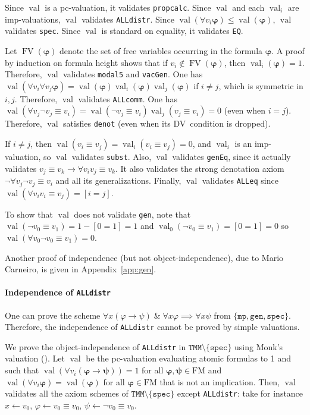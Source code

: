\documentclass[11pt]{article}
\newcommand*{\andd}{\;\&\;}
\newcommand*{\rimplies}{\implies}
\renewcommand*{\phi}{\varphi}
\newcommand*{\FM}{\mathrm{FM}}
\DeclareMathOperator{\FV}{FV}
\DeclareMathOperator{\val}{val}
\theoremstyle{plain}
\theoremstyle{definition}
\theoremstyle{remark}
\begin{document}
Since $\val$ is a pc-valuation, it validates \texttt{propcalc}.
Since $\val$ and each $\val_i$ are imp-valuations, $\val$ validates \texttt{ALLdistr}.
Since $\val(\forall v_i \bm\phi) \leq \val(\bm\phi)$, $\val$ validates \texttt{spec}.
Since $\val$ is standard on equality, it validates \texttt{EQ}.

Let $\FV(\bm\phi)$ denote the set of free variables occurring in the formula $\bm\phi$.
A proof by induction on formula height shows that if $v_i \notin \FV(\bm\phi)$, then
$\val_i(\bm\phi) = 1$.
Therefore, $\val$ validates \texttt{modal5} and \texttt{vacGen}.
One has $\val(\forall v_i \forall v_j \bm\phi) = \val(\bm\phi) \val_i(\bm\phi) \val_j(\bm\phi)$
if $i \neq j$, which is symmetric in $i, j$.
Therefore, $\val$ validates \texttt{ALLcomm}.
One has
$\val(\forall v_j \neg v_j \equiv v_i) = \val(\neg v_j \equiv v_i) \val_j(v_j \equiv v_i) = 0$
(even when $i=j$).
Therefore, $\val$ satisfies \texttt{denot} (even when its DV~condition is dropped).

If $i \neq j$, then $\val(v_i \equiv v_j) = \val_i(v_i \equiv v_j) = 0$, and $\val_i$ is an
imp-valuation, so $\val$ validates \texttt{subst}.
Also, $\val$ validates \texttt{genEq}, since it actually validates
$v_j \equiv v_k \to \forall v_i v_j \equiv v_k$.
It also validates the strong denotation axiom $\neg \forall v_j \neg v_j \equiv v_i$
and all its generalizations.
Finally, $\val$ validates \texttt{ALLeq} since $\val(\forall v_i v_i \equiv v_j) = [i = j]$.

To show that $\val$ does not validate \texttt{gen}, note that
$\val(\neg v_0 \equiv v_1) = 1 - [0 = 1] = 1$ and $\val_0(\neg v_0 \equiv v_1) = [0 = 1] = 0$
so $\val(\forall v_0 \neg v_0 \equiv v_1) = 0$.

Another proof of independence (but not object-independence), due to Mario Carneiro, is given in
Appendix~\ref{app:gen}.


\paragraph{Independence of \texttt{ALLdistr}}

One can prove the scheme $\forall x (\phi \to \psi) \andd \forall x \phi \rimplies \forall x \psi$
from $\{ \texttt{mp}, \texttt{gen}, \texttt{spec} \}$.
Therefore, the independence of \texttt{ALLdistr} cannot be proved by simple valuations.


We prove the object-independence of \texttt{ALLdistr} in $\texttt{TMM} \setminus \{ \texttt{spec} \}$
using Monk's valuation (\cite[Thm.~9, Part~4 (C4)]{monk}).
Let $\val$ be the pc-valuation evaluating atomic formulas to 1 and such that
$\val(\forall v_i (\bm\phi \to \bm\psi)) = 1$ for all $\bm\phi, \bm\psi \in \FM$ and
$\val(\forall v_i \bm\phi) = \val(\bm\phi)$ for all $\bm\phi \in \FM$ that is not an implication.
Then, $\val$ validates all the axiom schemes of $\texttt{TMM} \setminus \{\texttt{spec}\}$ except
\texttt{ALLdistr}: take for instance $x \leftarrow v_0$, $\phi \leftarrow v_0 \equiv v_0$,
$\psi \leftarrow \neg v_0 \equiv v_0$.
\end{document}
